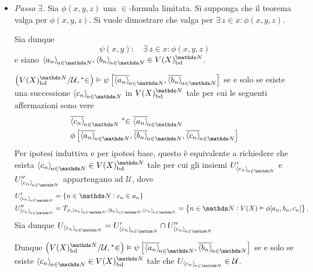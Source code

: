 {\begin{itemize}
        Poiché $ \mathcal{U} $ è un ultrafiltro allora è primo, e quindi la condizione di cui sopra è equivalente a $ T_{\phi, \sequence{a_{n} }}  \cup T_{\psi, \sequence{a_{n} }}  \in \mathcal{U} $. La tesi segue dal fatto che \begin{equation*}
            T_{\phi, \sequence{a_{n} }}  \cup T_{\psi, \sequence{a_{n} }} = T_{\phi\lor\psi, \sequence{a_{n} }}. 
        \end{equation*}
        \item \textit{Passo $ \exists $.} Sia $ \phi(x,y,z) $ una $ \in $-formula limitata. Si supponga che il teorema valga per $ \phi(x,y,z) $. Si vuole dimostrare che valga per $ \exists\,z \in x: \phi(x,y,z) $.
        
        Sia dunque \begin{equation*}
            \psi(x,y): \quad \exists\,z \in x: \phi(x,y,z)
        \end{equation*}e siano $ \sequence{a_{n} }, \sequence{b_{n} } \in V(X)^{\N}_{\bounded}$. 

        $\left(V(X)^{\N}_{\bounded}/\mathcal{U}, \nonstandard{\in}\right)\vDash\psi\left[\filtersequence{a_{n}},\filtersequence{b_{n}}\right]  $ se e solo se esiste una successione $ \sequence{c_{n}} $ in $ V(X)^{\N}_{\bounded} $ tale per cui le seguenti affermazioni sono vere \begin{align*}
            &\filtersequence{c_{n}} \mathrel{\nonstandard{\in}} \filtersequence{a_{n}}\\
            &\phi\left[\filtersequence{a_{n}},\filtersequence{b_{n}},\filtersequence{c_{n}}\right]
        \end{align*}Per ipotesi induttiva e per ipotesi base, questo è equivalente a richiedere che esista $ \sequence{c_{n} } \in V(X)^{\N}_{\bounded} $ tale per cui gli insiemi $ U_{\sequence{c_{n} }}'  $ e $ U_{\sequence{c_{n} }}'' $ appartengano ad $ \mathcal{U}  $, dove \begin{align*}
            U_{\sequence{c_{n} }}' &= \set{n \in \N: c_{n} \in a_{n}  }\\ 
            U_{\sequence{c_{n} }}'' &= T_{\phi, \sequence{a_{n} }, \sequence{b_{n} }, \sequence{c_{n} }} = \set{n \in \N: V(X)\vDash \phi[a_{n}, b_{n}, c_{n}   ]}. 
        \end{align*}Sia dunque $ U_{\sequence{c_{n} }} =  U_{\sequence{c_{n} }}'\cap U_{\sequence{c_{n} }}'' $

        Dunque $\left(V(X)^{\N}_{\bounded}/\mathcal{U}, \nonstandard{\in}\right)\vDash\psi\left[\filtersequence{a_{n}},\filtersequence{b_{n}}\right]  $ se e solo se esiste $ \sequence{c_{n} } \in V(X)^{\N}_{\bounded} $ tale che $ U_{\sequence{c_{n}}} \in \mathcal{U}$.


\end{itemize}}
